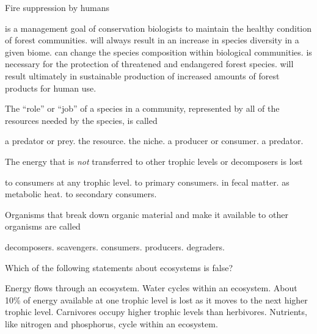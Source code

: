 \question
Fire suppression by humans

\begin{choices}
\choice is a management goal of conservation biologists to maintain the healthy condition of forest communities.
\choice will always result in an increase in species diversity in a given biome. 
\correctchoice can change the species composition within biological communities. 
\choice is necessary for the protection of threatened and endangered forest species. 
\choice will result ultimately in sustainable production of increased amounts of forest products for human use. 
\end{choices}

\question
The ``role'' or ``job'' of a species in a community, represented by all of the resources needed by the species, is called 

\begin{choices}
\choice a predator or prey.
\choice the resource.
\correctchoice the niche.
\choice a producer or consumer.
\choice a predator.
\end{choices}

\question
The energy that is \textit{not} transferred to other trophic levels or decomposers is lost

\begin{choices}
\choice to consumers at any trophic level.
\choice to primary consumers.
\choice in fecal matter.
\correctchoice as metabolic heat.
\choice to secondary consumers.
\end{choices}

\question
Organisms that break down organic material and make it available to other organisms are called

\begin{choices}
\correctchoice decomposers.
\choice scavengers. 
\choice consumers.
\choice producers.
\choice degraders.
\end{choices}

\question
Which of the following statements about ecosystems is false?

\begin{choices}
\choice Energy flows through an ecosystem. 
\choice Water cycles within an ecosystem. 
\correctchoice About 10\% of energy available at one trophic level is lost as it moves to the next higher trophic level. 
\choice Carnivores occupy higher trophic levels than herbivores. 
\choice Nutrients, like nitrogen and phosphorus, cycle within an ecosystem. 
\end{choices}

